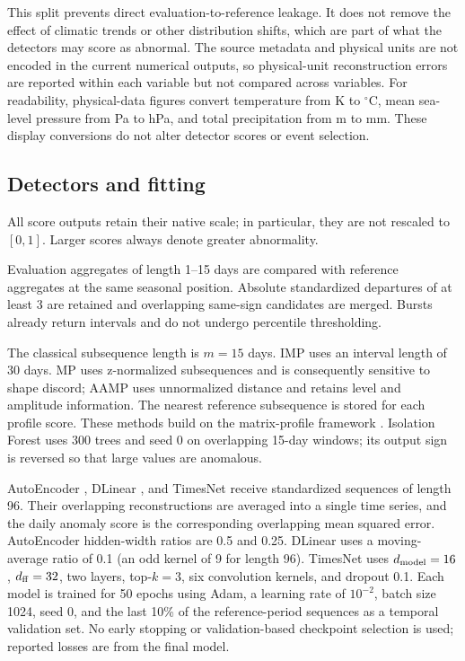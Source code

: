 \documentclass[11pt,a4paper]{article}
\begin{document}
This split prevents direct evaluation-to-reference leakage. It does not remove the effect
of climatic trends or other distribution shifts, which are part of what the
detectors may score as abnormal. The source metadata and physical units are not
encoded in the current numerical outputs, so physical-unit reconstruction
errors are reported within each variable but not compared across variables.
For readability, physical-data figures convert temperature from K to
$^\circ$C, mean sea-level pressure from Pa to hPa, and total precipitation
from m to mm. These display conversions do not alter detector scores or event
selection.

\subsection{Detectors and fitting}
All score outputs retain their native scale; in particular, they are not
rescaled to $[0,1]$. Larger scores always denote greater abnormality.

\begin{description}[style=nextline]
\item[Seasonal bursts.]
Evaluation aggregates of length 1--15 days are compared with reference aggregates at
the same seasonal position. Absolute standardized departures of at least 3 are
retained and overlapping same-sign candidates are merged. Bursts already
return intervals and do not undergo percentile thresholding.

\item[Subsequence and ensemble detectors.]
The classical subsequence length is $m=15$ days. IMP uses an interval length of
30 days. MP uses z-normalized subsequences and is consequently sensitive to
shape discord; AAMP uses unnormalized distance and retains level and amplitude
information. The nearest reference subsequence is stored for each profile
score. These methods build on the matrix-profile framework
\cite{matrixprofile}. Isolation Forest \cite{iforest} uses 300 trees and seed 0
on overlapping 15-day windows; its output sign is reversed so that large
values are anomalous.

\item[Deep reconstruction detectors.]
AutoEncoder \cite{autoencoder}, DLinear \cite{dlinear}, and TimesNet
\cite{timesnet} receive standardized sequences of length 96. Their overlapping
reconstructions are averaged into a single time series,
and the daily anomaly score is the corresponding overlapping mean squared
error. AutoEncoder hidden-width ratios are 0.5 and 0.25. DLinear uses a
moving-average ratio of 0.1 (an odd kernel of 9 for length 96). TimesNet uses
$d_{\rm model}=16$, $d_{\rm ff}=32$, two layers, top-$k=3$, six convolution
kernels, and dropout 0.1. Each model is trained for 50 epochs using Adam, a
learning rate of $10^{-2}$, batch size 1024, seed 0, and the last 10\% of the
reference-period sequences as a temporal validation set. No early stopping or
validation-based checkpoint selection is used; reported losses are from the
final model.
\end{description}
\end{document}
